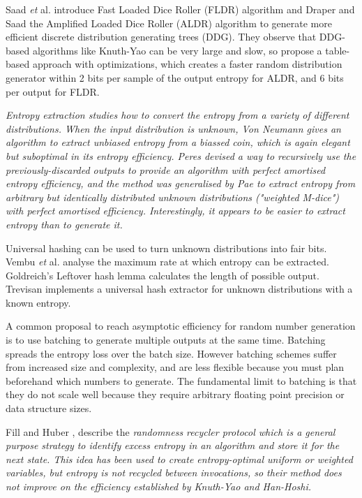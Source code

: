\documentclass[lettersize,onecolumn]{IEEEtran}
\begin{document}
Saad \emph{et} al. \cite{saad2020fldr} introduce Fast Loaded Dice Roller (FLDR) algorithm and Draper and Saad \cite{draper2025efficient} the Amplified Loaded Dice Roller (ALDR) algorithm to generate more efficient discrete distribution generating trees (DDG). They observe that DDG-based algorithms like Knuth-Yao can be very large and slow, so propose a table-based approach with optimizations, which creates a faster random distribution generator within 2 bits per sample of the output entropy for ALDR, and 6 bits per output for FLDR.

\em Entropy extraction \em studies how to convert the entropy \em from \em a variety of different distributions. When the input distribution is unknown, Von Neumann \cite{neumann51} gives an algorithm to extract unbiased entropy from a biassed coin, which is again elegant but suboptimal in its entropy efficiency. Peres \cite{peres1992iterating} devised a way to recursively use the previously-discarded outputs to provide an algorithm with perfect amortised entropy efficiency, and the method was generalised by Pae \cite{pae15} to extract entropy from arbitrary but identically distributed unknown distributions ("weighted M-dice") with perfect amortised efficiency. Interestingly, it appears to be easier to extract entropy than to generate it.

Universal hashing can be used to turn unknown distributions into fair bits. Vembu \emph{et} al. \cite{vembu95} analyse the maximum rate at which entropy can be extracted. Goldreich's Leftover hash lemma \cite{goldreich2004foundations} calculates the length of possible output. Trevisan \cite{trevisan2001extractors} implements a universal hash extractor for unknown distributions with a known entropy. 

A common proposal to reach asymptotic efficiency for random number generation is to use batching to generate multiple outputs at the same time. \cite{bacher2017,han97,devroye86,Knuth1976TheCO,lumbroso2013optimal} Batching spreads the entropy loss over the batch size. However batching schemes suffer from increased size and complexity, and are less flexible because you must plan beforehand which numbers to generate. The fundamental limit to batching is that they do not scale well because they require arbitrary floating point precision or data structure sizes.

Fill and Huber \cite{fill2000randomness, huber2016perfect}, describe the \em randomness recycler \em protocol which is a general purpose strategy to identify excess entropy in an algorithm and store it for the next state. This idea has been used to create entropy-optimal uniform \cite{lumbroso2013optimal, huber2024optimalrollingfairdice} or weighted \cite{huber2024optimalrollingfairdice} variables, but entropy is not recycled between invocations, so their method does not improve on the efficiency established by Knuth-Yao and Han-Hoshi.
\end{document}
